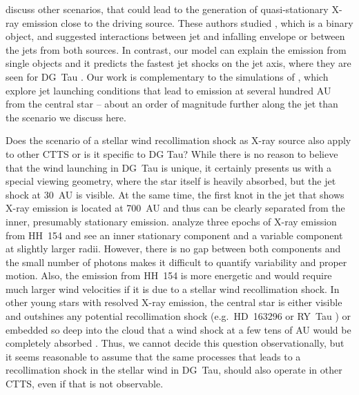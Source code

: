 \citet{2003ApJ...584..843B} discuss other scenarios, that could lead to the generation of quasi-stationary X-ray emission close to the driving source. These authors studied , which is a binary object, and suggested interactions between jet and infalling envelope or between the jets from both sources. In contrast, our model can explain the emission from single objects and it predicts the fastest jet shocks on the jet axis, where they are seen for DG~Tau \citep{2013A&A...550L...1S}. Our work is complementary to the simulations of \citet{2010A&A...517A..68B,2010A&A...511A..42B,2011ApJ...737...54B}, which explore jet launching conditions that lead to emission at several hundred AU from the central star -- about an order of magnitude further along the jet than the scenario we discuss here.

Does the scenario of a stellar wind recollimation shock as X-ray source also apply to other CTTS or is it specific to DG Tau? While there is no reason to believe that the wind launching in DG~Tau is unique, it certainly presents us with a special viewing geometry, where the star itself is heavily absorbed, but the jet shock at 30~AU is visible. At the same time, the first knot in the jet that shows X-ray emission is located at 700~AU and thus can be clearly separated from the inner, presumably stationary emission. \citet{2011A&A...530A.123S} analyze three epochs of X-ray emission from HH~154 and see an inner stationary component and a variable component at slightly larger radii. However, there is no gap between both components and the small number of photons makes it difficult to quantify variability and proper motion. Also, the emission from HH~154 is more energetic and would require much larger wind velocities if it is due to a stellar wind recollimation shock. In other young stars with resolved X-ray emission, the central star is either visible and outshines any potential recollimation shock (e.g.\ HD~163296 \citep{2005ApJ...628..811S,2013A&A...552A.142G} or RY~Tau \citep{2014ApJ...788..101S}) or embedded so deep into the cloud that a wind shock at a few tens of AU would be completely absorbed \citep[e.g.\ HH80/81][]{http://adsabs.harvard.edu/abs/2004ApJ...605..259P}. Thus, we cannot decide this question observationally, but it seems reasonable to assume that the same processes that leads to a recollimation shock in the stellar wind in DG~Tau, should also operate in other CTTS, even if that is not observable.

